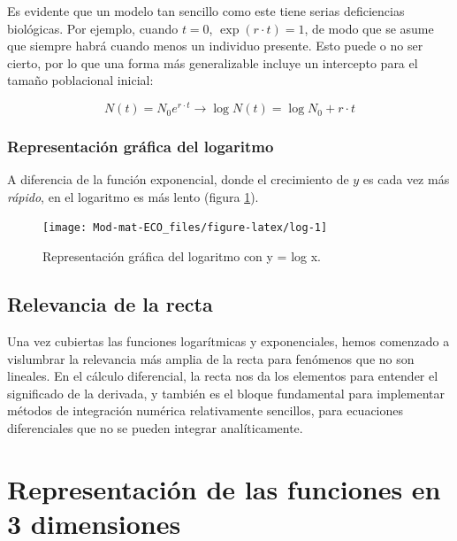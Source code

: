 \documentclass[
]{book}
\begin{document}
Es evidente que un modelo tan sencillo como este tiene serias deficiencias biológicas. Por ejemplo, cuando \(t = 0\), \(\exp(r \cdot t) = 1\), de modo que se asume que siempre habrá cuando menos un individuo presente. Esto puede o no ser cierto, por lo que una forma más generalizable incluye un intercepto para el tamaño poblacional inicial:

\begin{equation}
    N(t) = N_0 e^{r \cdot t} \rightarrow \log N(t) = \log N_0 + r \cdot t
\end{equation}

\hypertarget{representaciuxf3n-gruxe1fica-del-logaritmo}{%
\subsubsection{Representación gráfica del logaritmo}\label{representaciuxf3n-gruxe1fica-del-logaritmo}}

A diferencia de la función exponencial, donde el crecimiento de \(y\) es cada vez más \emph{rápido}, en el logaritmo es más lento (figura \ref{fig:log}).

\begin{figure}

{\centering \texttt{[image: Mod-mat-ECO\_files/figure-latex/log-1]} 

}

\caption{Representación gráfica del logaritmo con y = log x.}\label{fig:log}
\end{figure}

\hypertarget{relevancia-de-la-recta}{%
\subsection{Relevancia de la recta}\label{relevancia-de-la-recta}}

Una vez cubiertas las funciones logarítmicas y exponenciales, hemos comenzado a vislumbrar la relevancia más amplia de la recta para fenómenos que no son lineales. En el cálculo diferencial, la recta nos da los elementos para entender el significado de la derivada, y también es el bloque fundamental para implementar métodos de integración numérica relativamente sencillos, para ecuaciones diferenciales que no se pueden integrar analíticamente.

\hypertarget{representaciuxf3n-de-las-funciones-en-3-dimensiones}{%
\section{Representación de las funciones en 3 dimensiones}\label{representaciuxf3n-de-las-funciones-en-3-dimensiones}}
\end{document}
